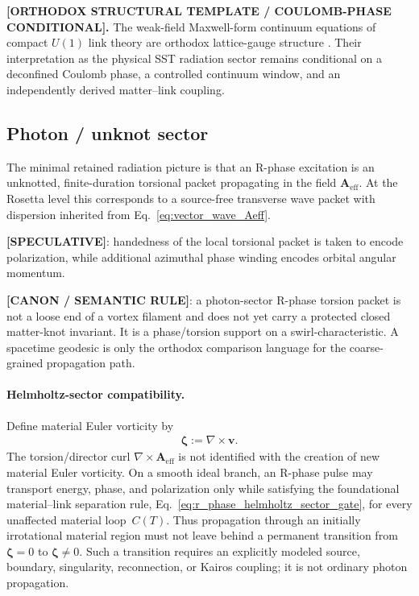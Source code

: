 \documentclass[11pt]{article}
\theoremstyle{definition}
\theoremstyle{plain}
\theoremstyle{remark}
\begin{document}
        \textbf{[ORTHODOX STRUCTURAL TEMPLATE / COULOMB-PHASE CONDITIONAL].}
        The weak-field Maxwell-form continuum equations of compact \(U(1)\) link
        theory are orthodox lattice-gauge structure
        \cite{Wilson1974,KogutSusskind1975,Kogut1979}.  Their interpretation as the
        physical SST radiation sector remains conditional on a deconfined Coulomb
        phase, a controlled continuum window, and an independently derived
        matter--link coupling.


    \subsection{Photon / unknot sector}

        The minimal retained radiation picture is that an R-phase excitation is an unknotted, finite-duration torsional packet propagating in the field $\mathbf{A}_{\mathrm{eff}}$. At the Rosetta level this corresponds to a source-free transverse wave packet with dispersion inherited from Eq.~\eqref{eq:vector_wave_Aeff}.

        \textbf{[SPECULATIVE]}: handedness of the local torsional packet is taken to encode polarization, while additional azimuthal phase winding encodes orbital angular momentum.

        \textbf{[CANON / SEMANTIC RULE]}:
        a photon-sector R-phase torsion packet is not a loose end of a vortex
        filament and does not yet carry a protected closed matter-knot invariant.
        It is a phase/torsion support on a swirl-characteristic. A spacetime
        geodesic is only the orthodox comparison language for the coarse-grained
        propagation path.

        \paragraph{Helmholtz-sector compatibility.}
        Define material Euler vorticity by
        \begin{align}
            \boldsymbol{\zeta}
            :=
            \nabla\times\mathbf v .
        \end{align}
        The torsion/director curl \(\nabla\times\mathbf A_{\mathrm{eff}}\) is not identified with the creation of new material Euler vorticity.  On a smooth ideal branch, an R-phase pulse may transport energy, phase, and polarization only while satisfying the foundational material--link separation rule, Eq.~\eqref{eq:r_phase_helmholtz_sector_gate}, for every unaffected material loop~\(C(T)\).  Thus propagation through an initially irrotational material region must not leave behind a permanent transition from \(\boldsymbol\zeta=0\) to \(\boldsymbol\zeta\neq0\). Such a transition requires an explicitly modeled source, boundary, singularity, reconnection, or Kairos coupling; it is not ordinary photon propagation.
\end{document}
